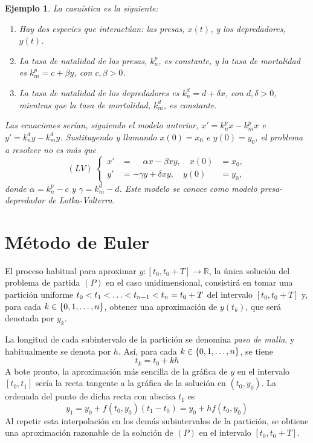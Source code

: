 \documentclass[11pt]{report}
\theoremstyle{mytheorem}
\theoremstyle{mydefinition}
\theoremstyle{myexample}
\newtheorem*{example}{Ejemplo}
\newcommand{\R}{\mathbb R}
\begin{document}
\begin{example}
La casuística es la siguiente:
\begin{enumerate}
    \item Hay dos especies que interactúan: las presas, $x(t)$, y los depredadores, $y(t)$.
    \item La tasa de natalidad de las presas, $k_n^p$, es constante, y la tasa de mortalidad es $k_m^p=c+\beta y$, con $c,\beta >0$.
    \item La tasa de natalidad de los depredadores es $k_n^d=d+\delta x$, con $d,\delta >0$, mientras que la tasa de mortalidad, $k_m^d$, es constante.
\end{enumerate}

Las ecuaciones serían, siguiendo el modelo anterior, $x'=k_n^px-k_m^px$ e $y'=k_n^dy-k_m^dy$. Sustituyendo y llamando $x(0)=x_0$ e $y(0)=y_0$, el problema a resolver no es más que
\[(LV) \ \left\{
\begin{alignedat}{2}
\, x'&=\phantom{-}\alpha x-\beta xy, \quad x(0)&=x_0, \\
\, y'&=-\gamma y+\delta xy, \quad y(0)&=y_0,
\end{alignedat}\right.\]
donde $\alpha=k_n^p-c$ y $\gamma = k_m^d-d$. Este modelo se conoce como \emph{modelo presa-depredador de Lotka-Volterra}.
\end{example}

\section{Método de Euler}

El proceso habitual para aproximar $y \colon [t_0, t_0+T] \to \R$, la única solución del problema de partida $(P)$ en el caso unidimensional, consistirá en tomar una partición uniforme $t_0<t_1<\mathellipsis<t_{n-1}<t_n=t_0+T$ del intervalo $[t_0,t_0+T]$ y, para cada $k \in \{0,1,\mathellipsis,n\}$, obtener una aproximación de $y(t_k)$, que será denotada por $y_k$. 

La longitud de cada subintervalo de la partición se denomina \emph{paso de malla}, y habitualmente se denota por $h$. Así, para cada $k \in \{0,1,\mathellipsis,n\}$, se tiene
\[t_k=t_0+kh\]
A bote pronto, la aproximación más sencilla de la gráfica de $y$ en el intervalo $[t_0, t_1]$ sería la recta tangente a la gráfica de la solución en $(t_0,y_0)$. La ordenada del punto de dicha recta con abscisa $t_1$ es
\[y_1=y_0+f(t_0,y_0)(t_1-t_0)=y_0+hf(t_0,y_0)\]
Al repetir esta interpolación en los demás subintervalos de la partición, se obtiene una aproximación razonable de la solución de $(P)$ en el intervalo $[t_0,t_0+T]$.
\end{document}
